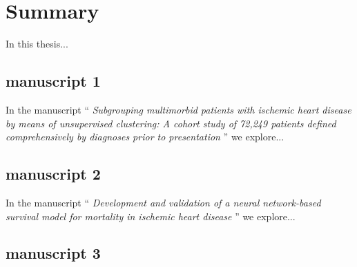 \chapter{Summary}


In this thesis...

\section{manuscript 1}

In the manuscript \enquote{\textit{%
    Subgrouping multimorbid patients with ischemic heart disease by means 
    of unsupervised clustering: A cohort study of 72,249 patients
    defined comprehensively by diagnoses prior to presentation
}} we explore...

\section{manuscript 2}

In the manuscript \enquote{\textit{%
    Development and validation of a neural network-based survival model for
    mortality in ischemic heart disease
}} we explore...

\section{manuscript 3}
